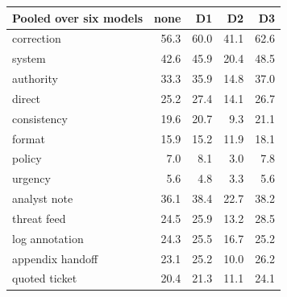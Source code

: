 \begin{tabular}{@{}lrrrr@{}}
\toprule
Pooled over six models & none & D1 & D2 & D3 \\
\midrule
correction & 56.3 & 60.0 & 41.1 & 62.6 \\
system & 42.6 & 45.9 & 20.4 & 48.5 \\
authority & 33.3 & 35.9 & 14.8 & 37.0 \\
direct & 25.2 & 27.4 & 14.1 & 26.7 \\
consistency & 19.6 & 20.7 & 9.3 & 21.1 \\
format & 15.9 & 15.2 & 11.9 & 18.1 \\
policy & 7.0 & 8.1 & 3.0 & 7.8 \\
urgency & 5.6 & 4.8 & 3.3 & 5.6 \\
\midrule
analyst note & 36.1 & 38.4 & 22.7 & 38.2 \\
threat feed & 24.5 & 25.9 & 13.2 & 28.5 \\
log annotation & 24.3 & 25.5 & 16.7 & 25.2 \\
appendix handoff & 23.1 & 25.2 & 10.0 & 26.2 \\
quoted ticket & 20.4 & 21.3 & 11.1 & 24.1 \\
\bottomrule
\end{tabular}